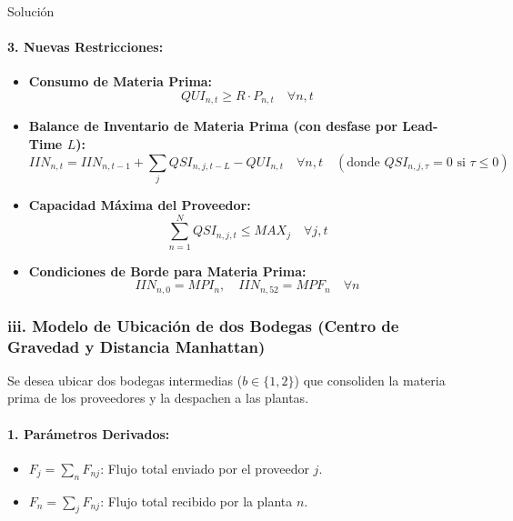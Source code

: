 \documentclass[11pt, a4paper]{article}
\begin{document}
\begin{ejercicio}{Solución}
  \paragraph{3. Nuevas Restricciones:}
  \begin{itemize}
    \item \textbf{Consumo de Materia Prima:}
    \begin{equation}
      QUI_{n,t} \ge R \cdot P_{n,t} \quad \forall n, t
    \end{equation}
    \item \textbf{Balance de Inventario de Materia Prima (con desfase por Lead-Time $L$):}
    \begin{equation}
      IIN_{n,t} = IIN_{n,t-1} + \sum_{j} QSI_{n,j,t-L} - QUI_{n,t} \quad \forall n, t \quad (\text{donde } QSI_{n,j,\tau} = 0 \text{ si } \tau \le 0)
    \end{equation}
    \item \textbf{Capacidad Máxima del Proveedor:}
    \begin{equation}
      \sum_{n=1}^{N} QSI_{n,j,t} \le MAX_j \quad \forall j, t
    \end{equation}
    \item \textbf{Condiciones de Borde para Materia Prima:}
    \begin{equation}
      IIN_{n,0} = MPI_n, \quad IIN_{n,52} = MPF_n \quad \forall n
    \end{equation}
  \end{itemize}

  \subsubsection*{iii. Modelo de Ubicación de dos Bodegas (Centro de Gravedad y Distancia Manhattan)}
  Se desea ubicar dos bodegas intermedias ($b \in \{1, 2\}$) que consoliden la materia prima de los proveedores y la despachen a las plantas.

  \paragraph{1. Parámetros Derivados:}
  \begin{itemize}
    \item $F_j = \sum_{n} F_{nj}$: Flujo total enviado por el proveedor $j$.
    \item $F_n = \sum_{j} F_{nj}$: Flujo total recibido por la planta $n$.
  \end{itemize}


\end{ejercicio}
\end{document}
